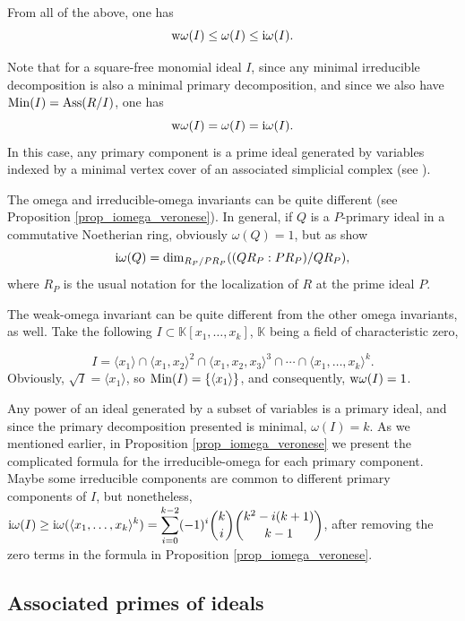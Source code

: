 \documentclass[11pt]{amsart}   %
\begin{document}
From all of the above, one has $${\rm w}\omega(I)\leq \omega(I)\leq {\rm i}\omega(I).$$

Note that for a square-free monomial ideal $I$, since any minimal irreducible decomposition is also a minimal primary decomposition, and since we also have ${\rm Min}(I)={\rm Ass}(R/I)$, one has $${\rm w}\omega(I)=\omega(I)={\rm i}\omega(I).$$ In this case, any primary component is a prime ideal generated by variables indexed by a minimal vertex cover of an associated simplicial complex (see \cite[Theorem 1.7]{MiSt}).

\begin{rem}\label{rem_iomega_vs_omega} The omega and irreducible-omega invariants can be quite different (see Proposition \ref{prop_iomega_veronese}). In general, if $Q$ is a $P$-primary ideal in a commutative Noetherian ring, obviously $\omega(Q)=1$, but as \cite[Exercises 8.29 and 8.30]{Sh} show $${\rm i}\omega(Q)=\dim_{R_P/PR_P}((QR_P:PR_P)/QR_P),$$ where $R_P$ is the usual notation for the localization of $R$ at the prime ideal $P$.

The weak-omega invariant can be quite different from the other omega invariants, as well. Take the following $I\subset\mathbb K[x_1,\ldots,x_k]$, $\mathbb K$ being a field of characteristic zero,

$$I=\langle x_1\rangle\cap \langle x_1,x_2\rangle^2\cap \langle x_1,x_2,x_3\rangle^3\cap\cdots\cap\langle x_1,\ldots,x_k\rangle^{k}.$$ Obviously, $\sqrt{I}=\langle x_1\rangle$, so ${\rm Min}(I)=\{\langle x_1\rangle\}$, and consequently, ${\rm w}\omega(I)=1$.

Any power of an ideal generated by a subset of variables is a primary ideal, and since the primary decomposition presented is minimal, $\omega(I)=k$. As we mentioned earlier, in Proposition \ref{prop_iomega_veronese} we present the complicated formula for the irreducible-omega for each primary component. Maybe some irreducible components are common to different primary components of $I$, but nonetheless, $\displaystyle {\rm i}\omega(I)\geq {\rm i}\omega(\langle x_1,\ldots,x_k\rangle^k)=\sum_{i=0}^{k-2}(-1)^i{{k}\choose{i}}{{k^2-i(k+1)}\choose{k-1}}$, after removing the zero terms in the formula in Proposition \ref{prop_iomega_veronese}.
\end{rem}

\subsection{Associated primes of ideals}\label{sec_assoc_ideals}
\end{document}
